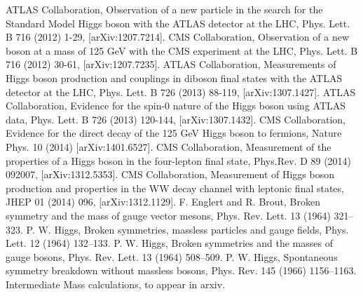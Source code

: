\documentclass[11pt]{article}
\begin{document}
\begin{thebibliography}{99}

 {} ATLAS Collaboration, Observation of a new particle in the search for the Standard Model
Higgs boson with the ATLAS detector at the LHC, Phys. Lett. B 716 (2012) 1-29,
[arXiv:1207.7214].
  {} CMS Collaboration, Observation of a new boson at a mass of 125 GeV with the CMS
experiment at the LHC, Phys. Lett. B 716 (2012) 30-61, [arXiv:1207.7235].
 {} ATLAS Collaboration, Measurements of Higgs boson production and couplings in diboson
final states with the ATLAS detector at the LHC, Phys. Lett. B 726 (2013) 88-119,
[arXiv:1307.1427].
 {}  ATLAS Collaboration, Evidence for the spin-0 nature of the Higgs boson using ATLAS data,
Phys. Lett. B 726 (2013) 120-144, [arXiv:1307.1432].
 {} CMS Collaboration, Evidence for the direct decay of the 125 GeV Higgs boson to fermions,
Nature Phys. 10 (2014) [arXiv:1401.6527].
 {}  CMS Collaboration, Measurement of the properties of a Higgs boson in the four-lepton final
state, Phys.Rev. D 89 (2014) 092007, [arXiv:1312.5353].
 {}  CMS Collaboration, Measurement of Higgs boson production and properties in the WW decay
channel with leptonic final states, JHEP 01 (2014) 096, [arXiv:1312.1129].
 F. Englert and R. Brout, Broken symmetry and the mass of gauge vector mesons,
Phys. Rev. Lett. 13 (1964) 321–323.
 P. W. Higgs, Broken symmetries, massless particles and gauge fields, Phys. Lett. 12 (1964)
132–133.
 P. W. Higgs, Broken symmetries and the masses of gauge bosons, Phys. Rev. Lett. 13 (1964)
508–509.
 P. W. Higgs, Spontaneous symmetry breakdown without massless bosons, Phys. Rev. 145
(1966) 1156–1163.
 Intermediate Mass calculations, to appear in arxiv.


\end{thebibliography}
\end{document}
